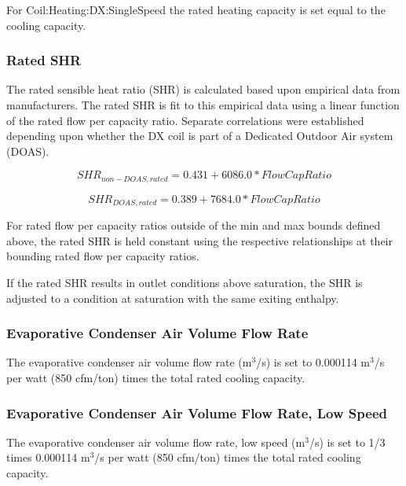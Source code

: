 For Coil:Heating:DX:SingleSpeed the rated heating capacity is set equal to the cooling capacity.

\subsubsection{Rated SHR}\label{rated-shr}

The rated sensible heat ratio (SHR) is calculated based upon empirical data from manufacturers. The rated SHR is fit to this empirical data using a linear function of the rated flow per capacity ratio. Separate correlations were established depending upon whether the DX coil is part of a Dedicated Outdoor Air system (DOAS).

\begin{equation}
SHR_{non-DOAS,rated} = 0.431 + 6086.0 * FlowCapRatio
\end{equation}

\begin{equation}
SHR_{DOAS,rated} = 0.389 + 7684.0 * FlowCapRatio
\end{equation}

For rated flow per capacity ratios outside of the min and max bounds defined above, the rated SHR is held constant using the respective relationships at their bounding rated flow per capacity ratios.

If the rated SHR results in outlet conditions above saturation, the SHR is adjusted to a condition at saturation with the same exiting enthalpy.

\subsubsection{Evaporative Condenser Air Volume Flow Rate}\label{evaporative-condenser-air-volume-flow-rate}

The evaporative condenser air volume flow rate (m\(^{3}\)/s) is set to 0.000114 m\(^{3}\)/s per watt (850 cfm/ton) times the total rated cooling capacity.

\subsubsection{Evaporative Condenser Air Volume Flow Rate, Low Speed}\label{evaporative-condenser-air-volume-flow-rate-low-speed}

The evaporative condenser air volume flow rate, low speed (m\(^{3}\)/s) is set to 1/3 times 0.000114 m\(^{3}\)/s per watt (850 cfm/ton) times the total rated cooling capacity.

